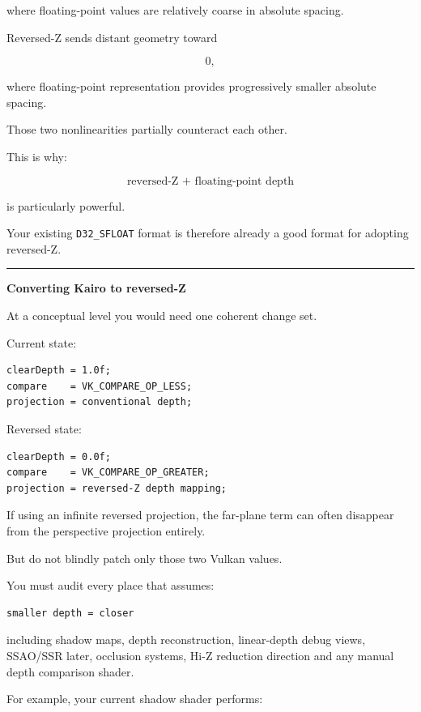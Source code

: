 where floating-point values are relatively coarse in absolute spacing.

Reversed-Z sends distant geometry toward

\[
0,
\]

where floating-point representation provides progressively smaller absolute spacing.

Those two nonlinearities partially counteract each other.

This is why:

\[
\boxed{\text{reversed-Z + floating-point depth}}
\]

is particularly powerful.

Your existing \texttt{D32\_SFLOAT} format is therefore already a good format for adopting reversed-Z.

\begin{center}\rule{0.5\linewidth}{0.5pt}\end{center}

\textbf{Converting Kairo to reversed-Z}

At a conceptual level you would need one coherent change set.

Current state:

\begin{verbatim}
clearDepth = 1.0f;
compare    = VK_COMPARE_OP_LESS;
projection = conventional depth;
\end{verbatim}

Reversed state:

\begin{verbatim}
clearDepth = 0.0f;
compare    = VK_COMPARE_OP_GREATER;
projection = reversed-Z depth mapping;
\end{verbatim}

If using an infinite reversed projection, the far-plane term can often disappear from the perspective projection entirely.

But do not blindly patch only those two Vulkan values.

You must audit every place that assumes:

\begin{verbatim}
smaller depth = closer
\end{verbatim}

including shadow maps, depth reconstruction, linear-depth debug views, SSAO/SSR later, occlusion systems, Hi-Z reduction direction and any manual depth comparison shader.

For example, your current shadow shader performs:

